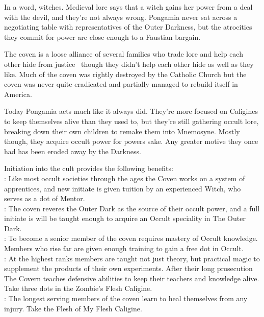 In a word, witches. Medieval lore says that a witch gains her power from a deal with the devil, and they're not always wrong. Pongamia never sat across a negotiating table with representatives of the Outer Darkness, but the atrocities they commit for power are close enough to a Faustian bargain. 

The coven is a loose alliance of several families who trade lore and help each other hide from justice \textemdash\, though they didn't help each other hide as well as they like. Much of the coven was rightly destroyed by the Catholic Church but the coven was never quite eradicated and partially managed to rebuild itself in America. 

Today Pongamia acts much like it always did. They're more focused on Caligines to keep themselves alive than they used to, but they're still gathering occult lore, breaking down their own children to remake them into Mnemosyne. Mostly though, they acquire occult power for powers sake. Any greater motive they once had has been eroded away by the Darkness. 

Initiation into the cult provides the following benefits: \\

\noindent \textbullet: Like most occult societies through the ages the Coven works on a system of apprentices, and new initiate is given tuition by an experienced Witch, who serves as a dot of Mentor.\\
\noindent \textbullet\textbullet: The coven reveres the Outer Dark as the source of their occult power, and a full initiate is will be taught enough to acquire an Occult speciality in The Outer Dark.\\
\noindent \textbullet\textbullet\textbullet: To become a senior member of the coven requires mastery of Occult knowledge. Members who rise far are given enough training to gain a free dot in Occult.\\
\noindent \textbullet\textbullet\textbullet\textbullet: At the highest ranks members are taught not just theory, but practical magic to supplement the products of their own experiments. After their long prosecution The Covern teaches defensive abilities to keep their teachers and knowledge alive. Take three dots in the Zombie's Flesh Caligine.\\
\noindent \textbullet\textbullet\textbullet\textbullet\textbullet: The longest serving members of the coven learn to heal themselves from any injury. Take the Flesh of My Flesh Caligine.

